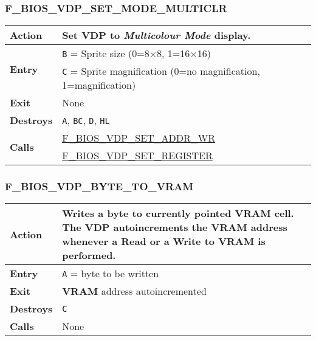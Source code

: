         \subsubsection{F\_BIOS\_VDP\_SET\_MODE\_MULTICLR}
        \label{func:fbiosvdpsetmodemulticlr}
        \begin{tabular}{l p{9cm}}
            \hline\textbf{Action}
            & Set \textbf{VDP} to \textit{Multicolour Mode} display.\\
            \hline\multirow[t]{2}{4em}{\textbf{Entry}}
            & \texttt{B} = Sprite size (0=8×8, 1=16×16)\\
            & \texttt{C} = Sprite magnification (0=no magnification,
                1=magnification)\\
            \hline\textbf{Exit} & None\\
            \hline\textbf{Destroys} & \texttt{A}, \texttt{BC}, \texttt{D},
            \texttt{HL} \\
            \hline\multirow[t]{2}{4em}{\textbf{Calls}}
            & \hyperref[func:fbiosvdpsetaddrwr]{F\_BIOS\_VDP\_SET\_ADDR\_WR}\\
            & \hyperref[func:fbiosvdpsetregister]{F\_BIOS\_VDP\_SET\_REGISTER}\\
            \hline
        \end{tabular}

        \subsubsection{F\_BIOS\_VDP\_BYTE\_TO\_VRAM}
        \label{func:fbiosvdpbytetovram}
        \begin{tabular}{l p{9cm}}
            \hline\textbf{Action}
            & Writes a byte to currently pointed \textbf{VRAM} cell. The 
            \textbf{VDP} autoincrements the \textbf{VRAM} address whenever a
            Read or a Write to \textbf{VRAM} is performed.\\
            \hline\textbf{Entry} & \texttt{A} = byte to be written\\
            \hline\textbf{Exit} & \textbf{VRAM} address autoincremented\\
            \hline\textbf{Destroys} & \texttt{C} \\
            \hline\textbf{Calls} & None\\
            \hline
        \end{tabular}

